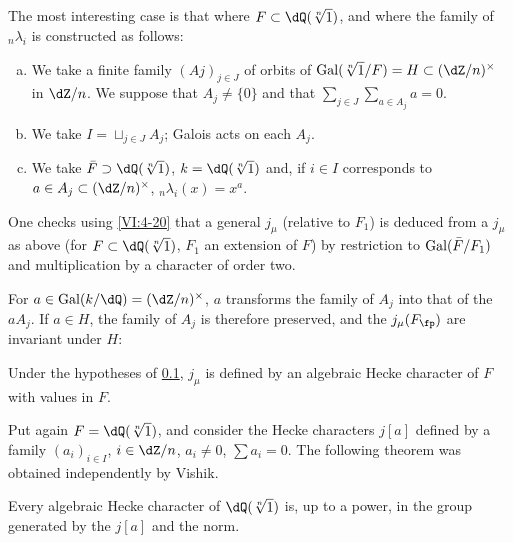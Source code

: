 \subsection{}\label{VI:6-9}

The most interesting case is that where $F\subset \dQ(\sqrt[n]{1})$, and
where the family of $_n \lambda_i$ is constructed as follows:
\begin{enumerate}[a)]
  \item We take a finite family $(Aj)_{j\in J}$ of orbits of
    $\gal(\sqrt[n]{1}/F)=H\subset (\dZ/n)^\times$ in $\dZ/n$. We suppose that
    $A_j\ne\{0\}$ and that $\sum_{j\in J} \sum_{a\in A_j} a=0$.
  \item We take $I=\sqcup_{j\in J} A_j$; Galois acts on each $A_j$.
  \item We take $\bar F\supset \dQ(\sqrt[n]{1})$, $k=\dQ(\sqrt[n]{1})$ and, if
    $i\in I$ corresponds to $a\in A_j\subset (\dZ/n)^\times$,
    $_n\lambda_i(x)=x^a$.
\end{enumerate}

One checks using \ref{VI:4-20} that a general $j_\mu$ (relative to
$F_1$) is deduced from a $j_\mu$ as above (for
$F\subset \dQ(\sqrt[n]{1})$, $F_1$ an extension of $F$) by restriction to
$\operatorname{Gal}(\bar F/F_1)$ and multiplication by a character of order two.

For $a\in \gal(k/\dQ)=(\dZ/n)^\times$, $a$ transforms the family of $A_j$
into that of the $a A_j$. If $a\in H$, the family of $A_j$ is therefore preserved,
and the $j_\mu(F_\fp)$ are invariant under $H$: 





\begin{proposition_}\label{VI:6-10}
Under the hypotheses of \ref{VI:6-9}, $j_\mu$ is defined by an algebraic
Hecke character of $F$ with values in $F$.
\end{proposition_}

Put again $F=\dQ(\sqrt[n]{1})$, and consider the Hecke
characters $j[a]$ defined by a family $(a_i)_{i\in I}$, $i\in \dZ/n$,
$a_i\ne 0$, $\sum a_i=0$. The following theorem was obtained
independently by Vishik. 





\begin{theorem_}\label{VI:6-11}
Every algebraic Hecke character of $\dQ(\sqrt[n]{1})$ is, up to a power,
in the group generated by the $j[a]$ and the norm.
\end{theorem_}

